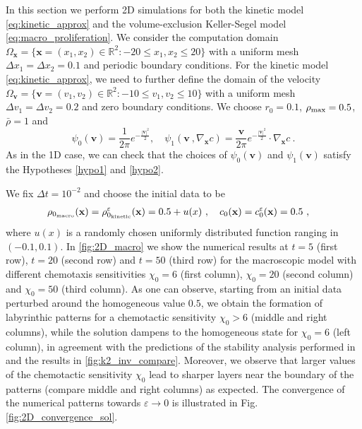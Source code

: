 \documentclass[review,onefignum,onetabnum]{siamart220329}
\begin{document}
In this section we perform 2D simulations for both  {{the kinetic model \cref{eq:kinetic_approx}}} and  {{the volume-exclusion Keller-Segel model \cref{eq:macro_proliferation}}}. 
We consider the computation domain $\Omega_\mathbf{x} = \{\mathbf{x} = (x_1,x_2)\in\mathbb{R}^2: -20\le x_1, x_2 \le 20\}$ with a uniform mesh $\Delta x_1 = \Delta x_2 = 0.1$ and periodic boundary conditions.  
For the kinetic model \cref{eq:kinetic_approx}, we need to further define the domain of the velocity $\Omega_\mathbf{v} = \{\mathbf{v} = (v_1,v_2)\in\mathbb{R}^2: -10\le v_1, v_2 \le 10\}$ with a uniform mesh $\Delta v_1 = \Delta v_2 = 0.2$ and zero boundary conditions. 
We choose $r_0=0.1$, $\rho_{\rm max} = 0.5$, $\bar{\rho} = 1$ and 
\begin{equation*}
    \psi_0(\mathbf{v}) = \frac{1}{2\pi} e^{-\frac{|\mathbf{v}|^2}{2}}, \quad \psi_1(\mathbf{v}\ , \nabla_\mathbf{x} c) = \frac{\mathbf{v}}{2\pi} e^{-\frac{|\mathbf{v}|^2}{2}}\cdot \nabla_\mathbf{x} c\ .
\end{equation*}
As in the 1D case, we can check that the choices of $\psi_0(\mathbf{v})$ and $\psi_1(\mathbf{v})$ satisfy the Hypotheses \cref{hypo1} and \cref{hypo2}.


We fix $\Delta t = 10^{-2}$ and choose the initial data to be
\begin{align*}
	&\rho_{0_\textnormal{macro}}(\mathbf{x}) =  \rho_{0_\textnormal{kinetic}}^\varepsilon(\mathbf{x}) =  0.5+u(x)\ , \quad c_0(\mathbf{x}) = c_0^\varepsilon(\mathbf{x}) = 0.5\ , %
\end{align*}
where $u(x)$ is a randomly chosen uniformly distributed function ranging in $(-0.1, 0.1)$. 
In \cref{fig:2D_macro} we show the numerical results at $t=5$ (first row), $t=20$ (second row) and $t=50$ (third row) for the macroscopic model with different chemotaxis sensitivities $\chi_0=6$ (first column), $\chi_0=20$ (second column) and $\chi_0=50$ (third column). As one can observe, starting from an initial data perturbed around the homogeneous value $0.5$, we obtain the formation of labyrinthic patterns for a chemotactic sensitivity $\chi_0>6$ (middle and right columns), while the solution dampens to the homogeneous state for $\chi_0=6$ (left column), in agreement with the predictions of the stability analysis performed in \cite{almeida2020treatment} and the results in \cref{fig:k2_inv_compare}. Moreover, we observe that larger values of the chemotactic sensitivity $\chi_0$ {lead} to sharper layers near the boundary of the patterns (compare middle and right columns) as expected. 
{\color{red} The convergence of the numerical patterns towards $\varepsilon\to0$ is illustrated in Fig. \ref{fig:2D_convergence_sol}.}
\end{document}
